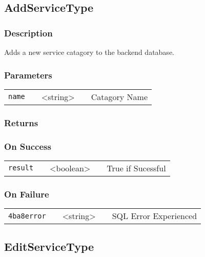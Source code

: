 \documentclass[a4paper,12pt]{article}
\begin{document}
\subsection{AddServiceType}

\subsubsection{Description}

Adds a new service catagory to the backend database.

\subsubsection{Parameters}

\begin{tabular}{ccccc}
\verb!name! & \vspace{15mm} & <string> & \vspace{15mm} & Catagory Name \\
\end{tabular}

\subsubsection{Returns}

\subsubsection{On Success}

\begin{tabular}{ccccc}
\verb!result! & \vspace{15mm} & <boolean> & \vspace{15mm} & True if Sucessful \\
\end{tabular}

\subsubsection{On Failure}

\begin{tabular}{ccccc}
\verb!4ba8error! & \vspace{15mm} & <string> & \vspace{15mm} & SQL Error Experienced \\
\end{tabular}

\subsection{EditServiceType}
\end{document}
